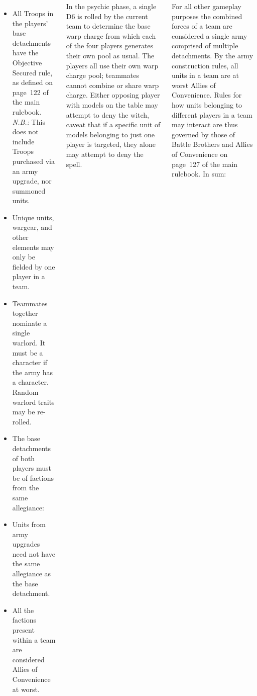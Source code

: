 \documentclass{40k}
\begin{document}
\begin{columns}
\begin{itemize}
\item All Troops in the players' base detachments have the Objective
  Secured rule, as defined on page~122 of the main rulebook.
  \emph{N.B.:} This does not include Troops purchased via an army
  upgrade, nor summoned units.

\item Unique units, wargear, and other elements may only be fielded by
  one player in a team.

\item Teammates together nominate a single warlord.  It must be a
  character if the army has a character.  Random warlord traits may be
  re-rolled.

\item The base detachments of both players must be of factions from
  the same allegiance:

\item Units from army upgrades need not have the same allegiance as
  the base detachment.

\item All the factions present within a team are considered Allies of
  Convenience at worst.
\end{itemize}


In the psychic phase, a single D6 is rolled by the current team to
determine the base warp charge from which each of the four players
generates their own pool as usual.  The players all use their own warp
charge pool; teammates cannot combine or share warp charge.  Either
opposing player with models on the table may attempt to deny the
witch, caveat that if a specific unit of models belonging to just one
player is targeted, they alone may attempt to deny the spell.

For all other gameplay purposes the combined forces of a team are
considered a single army comprised of multiple detachments.  By the
army construction rules, all units in a team are at worst Allies of
Convenience.  Rules for how units belonging to different players in a
team may interact are thus governed by those of Battle Brothers and
Allies of Convenience on page~127 of the main rulebook.  In sum:


\end{columns}
\end{document}
